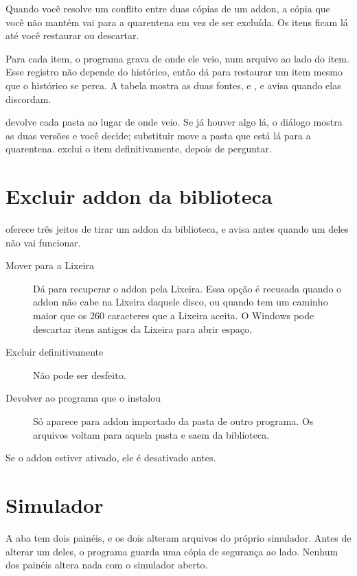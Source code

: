 \documentclass[11pt,a4paper]{article}
\begin{document}
Quando você resolve um conflito entre duas cópias de um addon, a cópia que você
não mantém vai para a quarentena em vez de ser excluída. Os itens ficam lá até
você restaurar ou descartar.

Para cada item, o programa grava de onde ele veio, num arquivo ao lado do item.
Esse registro não depende do histórico, então dá para restaurar um item mesmo
que o histórico se perca. A tabela mostra as duas fontes,  e
, e avisa quando elas discordam.


 devolve cada pasta ao lugar de onde veio. Se já houver algo lá, o
diálogo mostra as duas versões e você decide; substituir move a pasta que está
lá para a quarentena.  exclui o item definitivamente, depois de
perguntar.

\section{Excluir addon da biblioteca}

 oferece três jeitos de tirar um addon da biblioteca, e avisa antes
quando um deles não vai funcionar.

\begin{description}
  \item[Mover para a Lixeira] Dá para recuperar o addon pela Lixeira. Essa opção
    é recusada quando o addon não cabe na Lixeira daquele disco, ou quando tem
    um caminho maior que os 260 caracteres que a Lixeira aceita. O Windows pode
    descartar itens antigos da Lixeira para abrir espaço.
  \item[Excluir definitivamente] Não pode ser desfeito.
  \item[Devolver ao programa que o instalou] Só aparece para addon importado da
    pasta de outro programa. Os arquivos voltam para aquela pasta e saem da
    biblioteca.
\end{description}

Se o addon estiver ativado, ele é desativado antes.

\section{Simulador}

A aba  tem dois painéis, e os dois alteram arquivos do próprio
simulador. Antes de alterar um deles, o programa guarda uma cópia de segurança
ao lado. Nenhum dos painéis altera nada com o simulador aberto.
\end{document}
